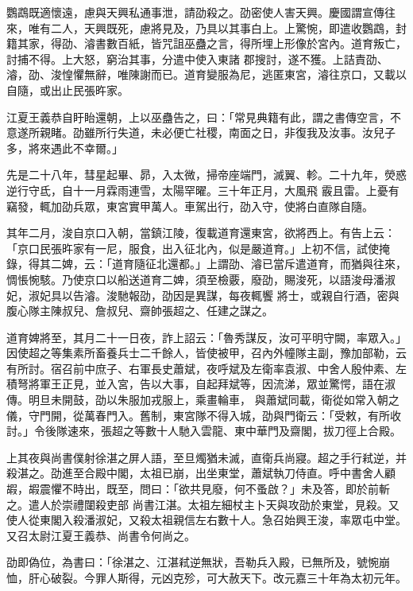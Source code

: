 \begin{pinyinscope}
 鸚鵡既適懷遠，慮與天興私通事泄，請劭殺之。劭密使人害天興。慶國謂宣傳往來，唯有二人，天興既死，慮將見及，乃具以其事白上。上驚惋，即遣收鸚鵡，封籍其家，得劭、濬書數百紙，皆咒詛巫蠱之言，得所埋上形像於宮內。道育叛亡，討捕不得。上大怒，窮治其事，分遣中使入東諸
 郡搜討，遂不獲。上詰責劭、濬，劭、浚惶懼無辭，唯陳謝而已。道育變服為尼，逃匿東宮，濬往京口，又載以自隨，或出止民張旿家。



 江夏王義恭自盱眙還朝，上以巫蠱告之，曰：「常見典籍有此，謂之書傳空言，不意遂所親睹。劭雖所行失道，未必便亡社稷，南面之日，非復我及汝事。汝兒子多，將來遇此不幸爾。」



 先是二十八年，彗星起畢、昴，入太微，掃帝座端門，滅翼、軫。二十九年，熒惑逆行守氐，自十一月霖雨連雪，太陽罕曜。三十年正月，大風飛
 霰且雷。上憂有竊發，輒加劭兵眾，東宮實甲萬人。車駕出行，劭入守，使將白直隊自隨。



 其年二月，浚自京口入朝，當鎮江陵，復載道育還東宮，欲將西上。有告上云：「京口民張旿家有一尼，服食，出入征北內，似是嚴道育。」上初不信，試使掩錄，得其二婢，云：「道育隨征北還都。」上謂劭、濬已當斥遣道育，而猶與往來，惆悵惋駭。乃使京口以船送道育二婢，須至檢覈，廢劭，賜浚死，以語浚母潘淑妃，淑妃具以告濬。浚馳報劭，劭因是異謀，每夜輒饗
 將士，或親自行酒，密與腹心隊主陳叔兒、詹叔兒、齋帥張超之、任建之謀之。



 道育婢將至，其月二十一日夜，詐上詔云：「魯秀謀反，汝可平明守闕，率眾入。」因使超之等集素所畜養兵士二千餘人，皆使被甲，召內外幢隊主副，豫加部勒，云有所討。宿召前中庶子、右軍長史蕭斌，夜呼斌及左衛率袁淑、中舍人殷仲素、左積弩將軍王正見，並入宮，告以大事，自起拜斌等，因流涕，眾並驚愕，語在淑傳。明旦未開鼓，劭以朱服加戎服上，乘畫輪車，
 與蕭斌同載，衛從如常入朝之儀，守門開，從萬春門入。舊制，東宮隊不得入城，劭與門衛云：「受敕，有所收討。」令後隊速來，張超之等數十人馳入雲龍、東中華門及齋閣，拔刀徑上合殿。



 上其夜與尚書僕射徐湛之屏人語，至旦燭猶未滅，直衛兵尚寢。超之手行弒逆，并殺湛之。劭進至合殿中閣，太祖已崩，出坐東堂，蕭斌執刀侍直。呼中書舍人顧嘏，嘏震懼不時出，既至，問曰：「欲共見廢，何不蚤啟？」未及答，即於前斬之。遣人於崇禮闥殺吏部
 尚書江湛。太祖左細杖主卜天與攻劭於東堂，見殺。又使人從東閣入殺潘淑妃，又殺太祖親信左右數十人。急召始興王浚，率眾屯中堂。又召太尉江夏王義恭、尚書令何尚之。



 劭即偽位，為書曰：「徐湛之、江湛弒逆無狀，吾勒兵入殿，已無所及，號惋崩恤，肝心破裂。今罪人斯得，元凶克殄，可大赦天下。改元嘉三十年為太初元年。




\end{pinyinscope}

